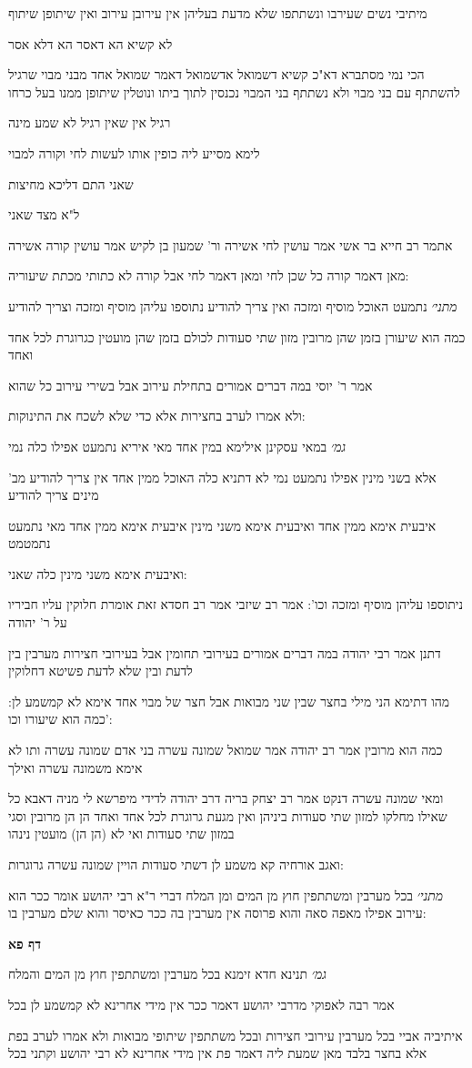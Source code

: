 \documentclass[12pt, openany]{book}
\newcommand{\sethebfont}{
\fontsize{10.5pt}{21.0pt} \selectfont
}
\newcommand{\textblock}[1]{
{\sethebfont #1\\}	
}
\newcommand{\sectname}{}
\newcommand{\newsection}[1]{
	\addcontentsline{toc}{section}{#1}
	\renewcommand{\sectname}{#1}	
	\vspace{-\baselineskip}
	\begin{center}
		\textbf{%
\fontsize{16pt}{16pt}\selectfont
			#1}
	\end{center}
	\vspace{-\baselineskip}
	\nopagebreak
}
\begin{document}
\textblock{מיתיבי נשים שעירבו ונשתתפו שלא מדעת בעליהן אין עירובן עירוב ואין שיתופן שיתוף}
\textblock{לא קשיא הא דאסר הא דלא אסר}
\textblock{הכי נמי מסתברא דא"כ קשיא דשמואל אדשמואל דאמר שמואל אחד מבני מבוי שרגיל להשתתף עם בני מבוי ולא נשתתף בני המבוי נכנסין לתוך ביתו ונוטלין שיתופן ממנו בעל כרחו}
\textblock{רגיל אין שאין רגיל לא שמע מינה}
\textblock{לימא מסייע ליה כופין אותו לעשות לחי וקורה למבוי}
\textblock{שאני התם דליכא מחיצות}
\textblock{ל"א מצד שאני}
\textblock{אתמר רב חייא בר אשי אמר עושין לחי אשירה ור' שמעון בן לקיש אמר עושין קורה אשירה}
\textblock{מאן דאמר קורה כל שכן לחי ומאן דאמר לחי אבל קורה לא כתותי מכתת שיעוריה:}
\textblock{{\large\emph{מתני׳}} נתמעט האוכל מוסיף ומזכה ואין צריך להודיע נתוספו עליהן מוסיף ומזכה וצריך להודיע}
\textblock{כמה הוא שיעורן בזמן שהן מרובין מזון שתי סעודות לכולם בזמן שהן מועטין כגרוגרת לכל אחד ואחד}
\textblock{אמר ר' יוסי במה דברים אמורים בתחילת עירוב אבל בשירי עירוב כל שהוא}
\textblock{ולא אמרו לערב בחצירות אלא כדי שלא לשכח את התינוקות:}
\textblock{{\large\emph{גמ׳}} במאי עסקינן אילימא במין אחד מאי איריא נתמעט אפילו כלה נמי}
\textblock{אלא בשני מינין אפילו נתמעט נמי לא דתניא כלה האוכל ממין אחד אין צריך להודיע מב' מינים צריך להודיע}
\textblock{איבעית אימא ממין אחד ואיבעית אימא משני מינין איבעית אימא ממין אחד מאי נתמעט נתמטמט}
\textblock{ואיבעית אימא משני מינין כלה שאני:}
\textblock{ניתוספו עליהן מוסיף ומזכה וכו': אמר רב שיזבי אמר רב חסדא זאת אומרת חלוקין עליו חביריו על ר' יהודה}
\textblock{דתנן אמר רבי יהודה במה דברים אמורים בעירובי תחומין אבל בעירובי חצירות מערבין בין לדעת ובין שלא לדעת פשיטא דחלוקין}
\textblock{מהו דתימא הני מילי בחצר שבין שני מבואות אבל חצר של מבוי אחד אימא לא קמשמע לן: כמה הוא שיעורו וכו':}
\textblock{כמה הוא מרובין אמר רב יהודה אמר שמואל שמונה עשרה בני אדם שמונה עשרה ותו לא אימא משמונה עשרה ואילך}
\textblock{ומאי שמונה עשרה דנקט אמר רב יצחק בריה דרב יהודה לדידי מיפרשא לי מניה דאבא כל שאילו מחלקו למזון שתי סעודות ביניהן ואין מגעת גרוגרת לכל אחד ואחד הן הן מרובין וסגי במזון שתי סעודות ואי לא (הן הן) מועטין נינהו}
\textblock{ואגב אורחיה קא משמע לן דשתי סעודות הויין שמונה עשרה גרוגרות:}
\textblock{{\large\emph{מתני׳}} בכל מערבין ומשתתפין חוץ מן המים ומן המלח דברי ר"א רבי יהושע אומר ככר הוא עירוב אפילו מאפה סאה והוא פרוסה אין מערבין בה ככר כאיסר והוא שלם מערבין בו:}
\newsection{דף פא}
\textblock{{\large\emph{גמ׳}} תנינא חדא זימנא בכל מערבין ומשתתפין חוץ מן המים והמלח}
\textblock{אמר רבה לאפוקי מדרבי יהושע דאמר ככר אין מידי אחרינא לא קמשמע לן בכל}
\textblock{איתיביה אביי בכל מערבין עירובי חצירות ובכל משתתפין שיתופי מבואות ולא אמרו לערב בפת אלא בחצר בלבד מאן שמעת ליה דאמר פת אין מידי אחרינא לא רבי יהושע וקתני בכל}
\end{document}
